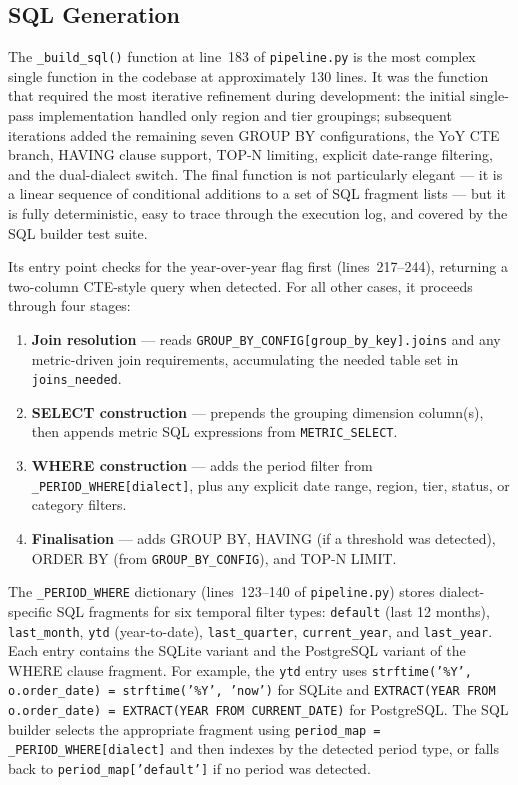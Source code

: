 \documentclass[12pt,a4paper]{report}
\begin{document}
\subsection{SQL Generation}
\label{subsec:sql-impl}

The \texttt{\_build\_sql()} function at line~183 of \texttt{pipeline.py} is the most complex single function in the codebase at approximately 130 lines. It was the function that required the most iterative refinement during development: the initial single-pass implementation handled only region and tier groupings; subsequent iterations added the remaining seven GROUP BY configurations, the YoY CTE branch, HAVING clause support, TOP-N limiting, explicit date-range filtering, and the dual-dialect switch. The final function is not particularly elegant — it is a linear sequence of conditional additions to a set of SQL fragment lists — but it is fully deterministic, easy to trace through the execution log, and covered by the SQL builder test suite.

Its entry point checks for the year-over-year flag first (lines~217--244), returning a two-column CTE-style query when detected. For all other cases, it proceeds through four stages:

\begin{enumerate}[leftmargin=2em,label=\arabic*.]
  \item \textbf{Join resolution} — reads \texttt{GROUP\_BY\_CONFIG[group\_by\_key].joins} and any metric-driven join requirements, accumulating the needed table set in \texttt{joins\_needed}.
  \item \textbf{SELECT construction} — prepends the grouping dimension column(s), then appends metric \ac{SQL} expressions from \texttt{METRIC\_SELECT}.
  \item \textbf{WHERE construction} — adds the period filter from \texttt{\_PERIOD\_WHERE[dialect]}, plus any explicit date range, region, tier, status, or category filters.
  \item \textbf{Finalisation} — adds GROUP BY, HAVING (if a threshold was detected), ORDER BY (from \texttt{GROUP\_BY\_CONFIG}), and TOP-N LIMIT.
\end{enumerate}

The \texttt{\_PERIOD\_WHERE} dictionary (lines~123--140 of \texttt{pipeline.py}) stores dialect-specific SQL fragments for six temporal filter types: \texttt{default} (last 12 months), \texttt{last\_month}, \texttt{ytd} (year-to-date), \texttt{last\_quarter}, \texttt{current\_year}, and \texttt{last\_year}. Each entry contains the SQLite variant and the PostgreSQL variant of the WHERE clause fragment. For example, the \texttt{ytd} entry uses \texttt{strftime('\%Y', o.order\_date) = strftime('\%Y', 'now')} for SQLite and \texttt{EXTRACT(YEAR FROM o.order\_date) = EXTRACT(YEAR FROM CURRENT\_DATE)} for PostgreSQL. The SQL builder selects the appropriate fragment using \texttt{period\_map = \_PERIOD\_WHERE[dialect]} and then indexes by the detected period type, or falls back to \texttt{period\_map['default']} if no period was detected.
\end{document}
